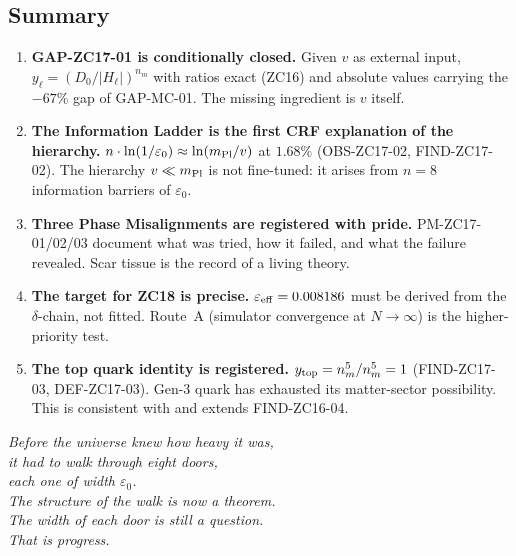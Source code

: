 \documentclass[12pt, a4paper]{article}
\begin{document}
\subsection{Summary}
\label{zc17:sec:summary}

\begin{enumerate}[leftmargin=*]

\item \textbf{GAP-ZC17-01 is conditionally closed.}
Given $v$ as external input, $y_\ell=({D_0}/{|H_\ell|})^{n_m}$
with ratios exact (ZC16) and absolute values carrying the
$-67\%$ gap of GAP-MC-01. The missing ingredient is $v$ itself.

\item \textbf{The Information Ladder is the first CRF explanation
  of the hierarchy.}
$n\cdot\ln(1/\varepsilon_0)\approx\ln(m_{\rm Pl}/v)$ at $1.68\%$
(OBS-ZC17-02, FIND-ZC17-02). The hierarchy $v\ll m_{\rm Pl}$
is not fine-tuned: it arises from $n=8$ information barriers
of $\varepsilon_0$.

\item \textbf{Three Phase Misalignments are registered with
  pride.}
PM-ZC17-01/02/03 document what was tried, how it failed, and
what the failure revealed. Scar tissue is the record of a
living theory.

\item \textbf{The target for ZC18 is precise.}
$\varepsilon_{\rm eff}=0.008186$ must be derived from the
$\delta$-chain, not fitted. Route~A (simulator convergence
at $N\to\infty$) is the higher-priority test.

\item \textbf{The top quark identity is registered.}
$y_{\rm top}=n_m^5/n_m^5=1$ (FIND-ZC17-03, DEF-ZC17-03).
Gen-3 quark has exhausted its matter-sector possibility.
This is consistent with and extends FIND-ZC16-04.

\end{enumerate}

\bigskip
\begin{center}
\textit{%
  Before the universe knew how heavy it was,\\
  it had to walk through eight doors,\\
  each one of width $\varepsilon_0$.\\[0.5em]
  The structure of the walk is now a theorem.\\
  The width of each door is still a question.\\[0.5em]
  That is progress.%
}
\end{center}
\end{document}
